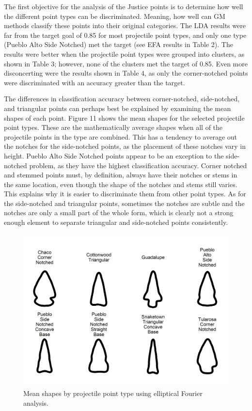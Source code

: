 \documentclass{article}
\begin{document}
The first objective for the analysis of the Justice points is to
determine how well the different point types can be discriminated.
Meaning, how well can GM methods classify these points into their
original categories. The LDA results were far from the target goal of
0.85 for most projectile point types, and only one type (Pueblo Alto
Side Notched) met the target (see EFA results in Table 2). The results
were better when the projectile point types were grouped into clusters,
as shown in Table 3; however, none of the clusters met the target of
0.85. Even more disconcerting were the results shown in Table 4, as only
the corner-notched points were discriminated with an accuracy greater
than the target.

The differences in classification accuracy between corner-notched,
side-notched, and triangular points can perhaps best be explained by
examining the mean shapes of each point. Figure 11 shows the mean shapes
for the selected projectile point types. These are the mathematically
average shapes when all of the projectile points in the type are
combined. This has a tendency to average out the notches for the
side-notched points, as the placement of these notches vary in height.
Pueblo Alto Side Notched points appear to be an exception to the
side-notched problem, as they have the highest classification accuracy.
Corner notched and stemmed points must, by definition, always have their
notches or stems in the same location, even though the shape of the
notches and stems still varies. This explains why it is easier to
discriminate them from other point types. As for the side-notched and
triangular points, sometimes the notches are subtle and the notches are
only a small part of the whole form, which is clearly not a strong
enough element to separate triangular and side-notched points
consistently.

\begin{figure}
\includegraphics[width=1\linewidth]{figures/meanShapesEFA} \caption{Mean shapes by projectile point type using elliptical Fourier analysis.}\label{fig:meanShapes}
\end{figure}
\end{document}
